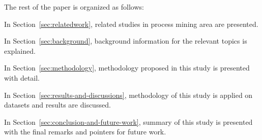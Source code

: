 The rest of the paper is organized as follows:
\begin{inparaenum}
	\item In Section~\ref{sec:relatedwork}, related studies in process mining area are presented. 
	\item In Section~\ref{sec:background}, background information for the relevant topics is explained.
	\item In Section~\ref{sec:methodology}, methodology proposed in this study is presented with detail.
	\item In Section~\ref{sec:results-and-discussions}, methodology of this study is applied on datasets and results are discussed.
	\item In Section~\ref{sec:conclusion-and-future-work}, summary of this study is presented with the final remarks and pointers for future work. 
\end{inparaenum}